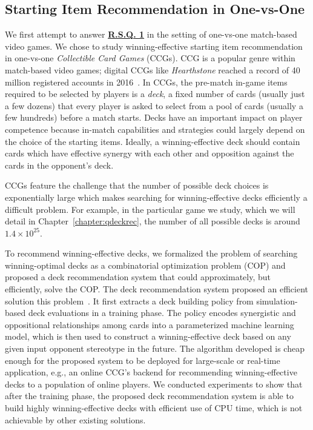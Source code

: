 \subsection{Starting Item Recommendation in One-vs-One}\label{sec:thesis_overview:item_recom}

We first attempt to answer \hyperref[rq1]{\textbf{R.S.Q. 1}} in the setting of one-vs-one match-based video games. We chose to study winning-effective starting item recommendation in one-vs-one \textit{Collectible Card Games} (CCGs). CCG is a popular genre within match-based video games; digital CCGs like \textit{Hearthstone} reached a record of 40 million registered accounts in 2016~\citep{hearthstonepopular}. In CCGs, the pre-match in-game items required to be selected by players is a \textit{deck}, a fixed number of cards (usually just a few dozens) that every player is asked to select from a pool of cards (usually a few hundreds) before a match starts. Decks have an important impact on player competence because in-match capabilities and strategies could largely depend on the choice of the starting items. Ideally, a winning-effective deck should contain cards which have effective synergy with each other and opposition against the cards in the opponent's deck. 

CCGs feature the challenge that the number of possible deck choices is exponentially large which makes searching for winning-effective decks efficiently a difficult problem. For example, in the particular game we study, which we will detail in Chapter~\ref{chapter:qdeckrec}, the number of all possible decks is around $1.4 \times 10^{25}$. 

To recommend winning-effective decks, we formalized the problem of searching winning-optimal decks as a combinatorial optimization problem (COP) and proposed a deck recommendation system that could approximately, but efficiently, solve the COP. The deck recommendation system proposed an efficient solution this problem~\citep{chenqdeckrec}. It first extracts a deck building policy from simulation-based deck evaluations in a training phase. The policy encodes synergistic and oppositional relationships among cards into a parameterized machine learning model, which is then used to construct a winning-effective deck based on any given input opponent stereotype in the future. The algorithm developed is cheap enough for the proposed system to be deployed for large-scale or real-time application, e.g., an online CCG's backend for recommending winning-effective decks to a population of online players. We conducted experiments to show that after the training phase, the proposed deck recommendation system is able to build highly winning-effective decks with efficient use of CPU time, which is not achievable by other existing solutions. 



